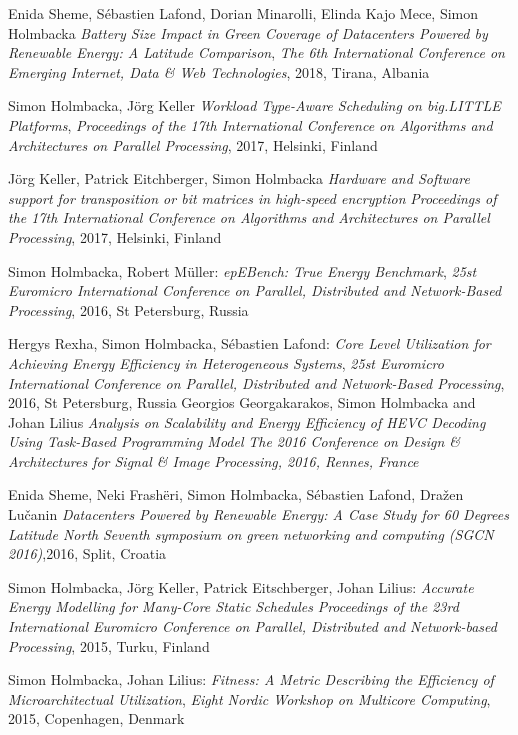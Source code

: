 \documentclass[margin,line]{resume}
\begin{document}
\begin{resume}
Enida Sheme, S\'{e}bastien Lafond, Dorian Minarolli, Elinda Kajo Mece, Simon Holmbacka
\textit{Battery Size Impact in Green Coverage of Datacenters Powered by Renewable Energy: A Latitude Comparison},
\textsl{The 6th International Conference on Emerging Internet, Data \& Web Technologies}, 2018, Tirana, Albania

Simon Holmbacka, J\"{o}rg Keller
\textit{Workload Type-Aware Scheduling on big.LITTLE Platforms},
\textsl{Proceedings of the 17th International Conference on Algorithms and Architectures on Parallel Processing}, 2017, Helsinki, Finland

J\"{o}rg Keller, Patrick Eitchberger, Simon Holmbacka
\textit{Hardware and Software support for transposition or bit matrices in high-speed encryption}
\textsl{Proceedings of the 17th International Conference on Algorithms and Architectures on Parallel Processing}, 2017, Helsinki, Finland

Simon Holmbacka, Robert M\"{u}ller: 
\textit{epEBench: True Energy Benchmark},
\textsl{25st Euromicro International Conference on Parallel, Distributed and Network-Based Processing}, 2016, St Petersburg, Russia

Hergys Rexha, Simon Holmbacka, S\'{e}bastien Lafond: 
\textit{Core Level Utilization for Achieving Energy Efficiency in Heterogeneous Systems},
\textsl{25st Euromicro International Conference on Parallel, Distributed and Network-Based Processing}, 2016, St Petersburg, Russia
\clearpage
Georgios Georgakarakos, Simon Holmbacka and Johan Lilius
\textit{Analysis on Scalability and Energy Efficiency of HEVC Decoding Using Task-Based Programming Model}
\textsl{The 2016 Conference on Design \& Architectures for Signal \& Image Processing, 2016, Rennes, France}

Enida Sheme, Neki Frash\"{e}ri, Simon Holmbacka, S\'{e}bastien Lafond, Dra\v{z}en Lu\v{c}anin 
\textit{Datacenters Powered by Renewable Energy: A Case Study for 60 Degrees Latitude North}
\textsl{Seventh symposium on green networking and computing (SGCN 2016)},2016, Split, Croatia

Simon Holmbacka, J\"{o}rg Keller, Patrick Eitschberger, Johan Lilius:
\textit{Accurate Energy Modelling for Many-Core Static Schedules}
\textsl{Proceedings of the 23rd International Euromicro Conference on Parallel, Distributed and Network-based Processing}, 2015, Turku, Finland

Simon Holmbacka, Johan Lilius: 
\textit{Fitness: A Metric Describing the Efficiency of Microarchitectual Utilization},
\textsl{Eight Nordic Workshop on Multicore Computing}, 2015, Copenhagen, Denmark


\end{resume}
\end{document}
